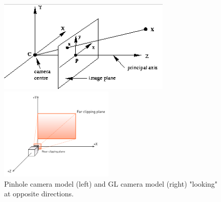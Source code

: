 \begin{figure} 
\centering   
\begin{minipage}[t]{0.45\textwidth}
\includegraphics[width=\linewidth, height=4.4cm]{schemas/hz_camera}
\end{minipage}
\begin{minipage}[t]{0.45\textwidth}
\includegraphics[width=\linewidth, height=4.4cm]{schemas/gl_camera}
\end{minipage}
\caption{Pinhole camera model (left) and GL camera model (right) "looking" at opposite directions.}
\label{fig:camera_model_comparison}
\end{figure}

